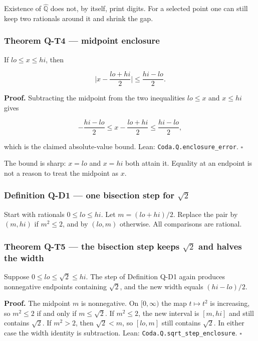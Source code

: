\documentclass[
  11pt,
]{article}
\begin{document}
Existence of \(\widehat{\mathbb{Q}}\) does not, by itself, print digits. For a selected point one can still keep two rationals around it and shrink the gap.

\subsubsection{Theorem Q-T4 --- midpoint enclosure}\label{theorem-q-t4-midpoint-enclosure}

If \(lo\le x\le hi\), then

\[
\biggl|x-\frac{lo+hi}{2}\biggr|
\le
\frac{hi-lo}{2}.
\]

\textbf{Proof.} Subtracting the midpoint from the two inequalities \(lo\le x\) and \(x\le hi\) gives

\[
-\frac{hi-lo}{2}
\le
x-\frac{lo+hi}{2}
\le
\frac{hi-lo}{2},
\]

which is the claimed absolute-value bound. Lean: \nolinkurl{Coda.Q.enclosure_error}. \(\square\)

The bound is sharp: \(x=lo\) and \(x=hi\) both attain it. Equality at an endpoint is not a reason to treat the midpoint as \(x\).

\subsubsection{\texorpdfstring{Definition Q-D1 --- one bisection step for \(\sqrt{2}\)}{Definition Q-D1 --- one bisection step for \textbackslash sqrt\{2\}}}\label{definition-q-d1-one-bisection-step-for-sqrt2}

Start with rationals \(0\le lo\le hi\). Let \(m=(lo+hi)/2\). Replace the pair by \((m,hi)\) if \(m^2\le 2\), and by \((lo,m)\) otherwise. All comparisons are rational.

\subsubsection{\texorpdfstring{Theorem Q-T5 --- the bisection step keeps \(\sqrt{2}\) and halves the width}{Theorem Q-T5 --- the bisection step keeps \textbackslash sqrt\{2\} and halves the width}}\label{theorem-q-t5-the-bisection-step-keeps-sqrt2-and-halves-the-width}

Suppose \(0\le lo\le\sqrt{2}\le hi\). The step of Definition Q-D1 again produces nonnegative endpoints containing \(\sqrt{2}\), and the new width equals \((hi-lo)/2\).

\textbf{Proof.} The midpoint \(m\) is nonnegative. On \([0,\infty)\) the map \(t\mapsto t^2\) is increasing, so \(m^2\le 2\) if and only if \(m\le\sqrt{2}\). If \(m^2\le 2\), the new interval is \([m,hi]\) and still contains \(\sqrt{2}\). If \(m^2>2\), then \(\sqrt{2}<m\), so \([lo,m]\) still contains \(\sqrt{2}\). In either case the width identity is subtraction. Lean: \nolinkurl{Coda.Q.sqrt_step_enclosure}. \(\square\)
\end{document}
